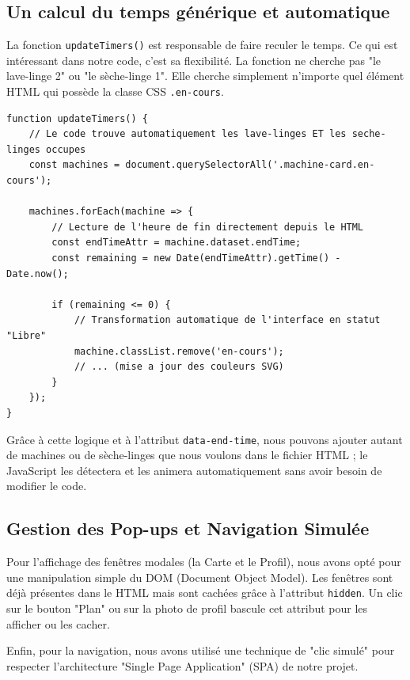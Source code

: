 \documentclass[12pt,a4paper]{article}
\begin{document}
\subsection*{Un calcul du temps générique et automatique}
La fonction \texttt{updateTimers()} est responsable de faire reculer le temps. Ce qui est intéressant dans notre code, c'est sa flexibilité. La fonction ne cherche pas "le lave-linge 2" ou "le sèche-linge 1". Elle cherche simplement n'importe quel élément HTML qui possède la classe CSS \texttt{.en-cours}. 

\begin{lstlisting}[caption={Extrait de la fonction de mise à jour du temps}]
function updateTimers() {
    // Le code trouve automatiquement les lave-linges ET les seche-linges occupes
    const machines = document.querySelectorAll('.machine-card.en-cours');

    machines.forEach(machine => {
        // Lecture de l'heure de fin directement depuis le HTML
        const endTimeAttr = machine.dataset.endTime;
        const remaining = new Date(endTimeAttr).getTime() - Date.now();

        if (remaining <= 0) {
            // Transformation automatique de l'interface en statut "Libre"
            machine.classList.remove('en-cours');
            // ... (mise a jour des couleurs SVG)
        }
    });
}
\end{lstlisting}

Grâce à cette logique et à l'attribut \texttt{data-end-time}, nous pouvons ajouter autant de machines ou de sèche-linges que nous voulons dans le fichier HTML ; le JavaScript les détectera et les animera automatiquement sans avoir besoin de modifier le code.

\subsection*{Gestion des Pop-ups et Navigation Simulée}
Pour l'affichage des fenêtres modales (la Carte et le Profil), nous avons opté pour une manipulation simple du DOM (Document Object Model). Les fenêtres sont déjà présentes dans le HTML mais sont cachées grâce à l'attribut \texttt{hidden}. Un clic sur le bouton "Plan" ou sur la photo de profil bascule cet attribut pour les afficher ou les cacher.

Enfin, pour la navigation, nous avons utilisé une technique de "clic simulé" pour respecter l'architecture "Single Page Application" (SPA) de notre projet. 

\newpage
\end{document}
